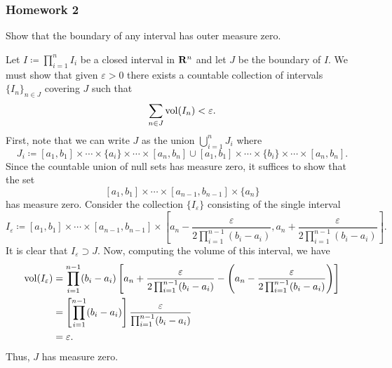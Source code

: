 \subsubsection{Homework 2}
\setcounter{exercise}{0}
\setcounter{equation}{0}

\begin{problem}
  Show that the boundary of any interval has outer measure zero.
\end{problem}
\begin{solution}
  Let $I\coloneq\prod_{i=1}^n I_i$ be a closed interval in $\mathbf{R}^n$ and let
  $J$ be the boundary of $I$. We must show that given $\varepsilon>0$ there
  exists a countable collection of intervals $\{I_n\}_{n\in J}$ covering
  $J$ such that
  \[
    \sum_{n\in J}\operatorname{vol}(I_n)<\varepsilon.
  \]
  First, note that we can write $J$ as the union $\bigcup_{i=1}^n J_i$
  where
  \[
    J_i\coloneq%
      [a_1,b_1]\times\cdots\times\{a_i\}\times\cdots\times[a_n,b_n]%
    \cup
    [a_1,b_1]\times\cdots\times\{b_i\}\times\cdots\times[a_n,b_n].
  \]
  Since the countable union of null sets has measure zero, it suffices to
  show that the set
  \[
    [a_1,b_1]\times\cdots\times[a_{n-1},b_{n-1}]\times\{a_n\}%
  \]
  has measure zero. Consider the collection $\{I_\varepsilon\}$ consisting
  of the single interval
  \[
    I_\varepsilon\coloneq [a_1,b_1]\times\cdots\times[a_{n-1},b_{n-1}]
    \times\left[a_n-\frac{\varepsilon}{2\prod_{i=1}^{n-1}(b_i-a_i)},
      a_n+\frac{\varepsilon}{2\prod_{i=1}^{n-1}(b_i-a_i)}\right].
  \]
  It is clear that $I_\varepsilon\supset J$. Now, computing the volume of
  this interval, we have
  \begin{align*}
    \vol(I_\varepsilon)%
    &=\prod_{i=1}^{n-1}(b_i-a_i)%
    \left[%
    a_n+\frac{\varepsilon}{2\prod_{i=1}^{n-1}(b_i-a_i)}%
    -\left(%
    a_n -\frac{\varepsilon}{2\prod_{i=1}^{n-1}(b_i-a_i)} \right)
    \right]\\
    &=\left[\prod_{i=1}^{n-1}(b_i-a_i)\right]%
      \frac{\varepsilon}{\prod_{i=1}^{n-1}(b_i-a_i)}\\
    &=\varepsilon.
  \end{align*}
  Thus, $J$ has measure zero.
\end{solution}

